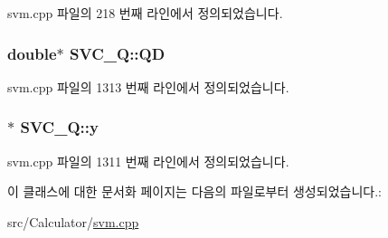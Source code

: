 svm.\+cpp 파일의 218 번째 라인에서 정의되었습니다.

\hypertarget{class_s_v_c___q_a635d129ea1d840296db2e8e1d4ada404}{
\subsubsection[{Q\+D}]{\setlength{\rightskip}{0pt plus 5cm}double$\ast$ S\+V\+C\+\_\+\+Q\+::\+Q\+D\hspace{0.3cm}{\ttfamily [private]}}}\label{class_s_v_c___q_a635d129ea1d840296db2e8e1d4ada404}


svm.\+cpp 파일의 1313 번째 라인에서 정의되었습니다.

\hypertarget{class_s_v_c___q_a6a37679890a665d32286a3ab047fc0f4}{
\subsubsection[{y}]{$\ast$ S\+V\+C\+\_\+\+Q\+::y\hspace{0.3cm}{\ttfamily [private]}}}\label{class_s_v_c___q_a6a37679890a665d32286a3ab047fc0f4}


svm.\+cpp 파일의 1311 번째 라인에서 정의되었습니다.



이 클래스에 대한 문서화 페이지는 다음의 파일로부터 생성되었습니다.\+:\begin{DoxyCompactItemize}
\item 
src/\+Calculator/\hyperlink{svm_8cpp}{svm.\+cpp}\end{DoxyCompactItemize}
